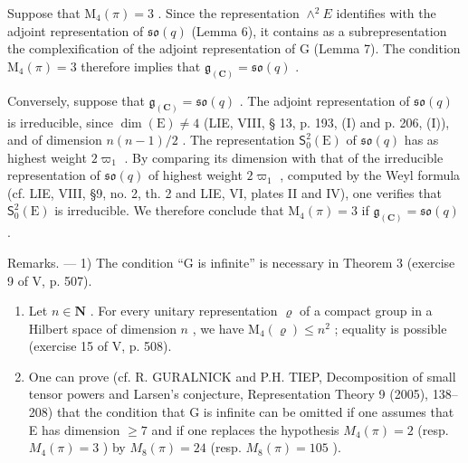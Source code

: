 Suppose that \(\mathrm{M}_{4}(\pi)=3\) . Since the representation \(\wedge^{2}E\) identifies with the adjoint representation of \(\mathfrak{so}(q)\) (Lemma 6), it contains as a subrepresentation the complexification of the adjoint representation of G (Lemma 7). The condition \(\mathrm{M}_{4}(\pi)=3\) therefore implies that \(\mathfrak{g}_{(\mathbf{C})}=\mathfrak{so}(q)\) .

Conversely, suppose that \(\mathfrak{g}_{(\mathbf{C})} = \mathfrak{so}(q)\) . The adjoint representation of \(\mathfrak{so}(q)\) is irreducible, since \(\dim(\mathrm{E}) \neq 4\) (LIE, VIII, § 13, p. 193, (I) and p. 206, (I)), and of dimension \(n(n-1)/2\) . The representation \(\mathsf{S}_0^2(\mathrm{E})\) of \(\mathfrak{so}(q)\) has as highest weight \(2\varpi_1\) . By comparing its dimension with that of the irreducible representation of \(\mathfrak{so}(q)\) of highest weight \(2\varpi_1\) , computed by the Weyl formula (cf. LIE, VIII, §9, no. 2, th. 2 and LIE, VI, plates II and IV), one verifies that \(\mathsf{S}_0^2(\mathrm{E})\) is irreducible. We therefore conclude that \(\mathrm{M}_4(\pi) = 3\) if \(\mathfrak{g}_{(\mathbf{C})} = \mathfrak{so}(q)\) .

Remarks. --- 1) The condition “G is infinite” is necessary in Theorem 3 (exercise 9 of V, p. 507).

\begin{enumerate}
\def\labelenumi{\arabic{enumi})}
\setcounter{enumi}{1}
\item
  Let \(n \in \mathbf{N}\) . For every unitary representation \(\varrho\) of a compact group in a Hilbert space of dimension \(n\) , we have \(\mathrm{M}_{4}(\varrho) \leqslant n^{2}\) ; equality is possible (exercise 15 of V, p. 508).
\item
  One can prove (cf. R. GURALNICK and P.H. TIEP, Decomposition of small tensor powers and Larsen's conjecture, Representation Theory 9 (2005), 138--208) that the condition that G is infinite can be omitted if one assumes that E has dimension \(\geqslant 7\) and if one replaces the hypothesis \(M_{4}(\pi) = 2\) (resp. \(M_{4}(\pi) = 3\) ) by \(M_{8}(\pi) = 24\) (resp. \(M_{8}(\pi) = 105\) ).
\end{enumerate}

